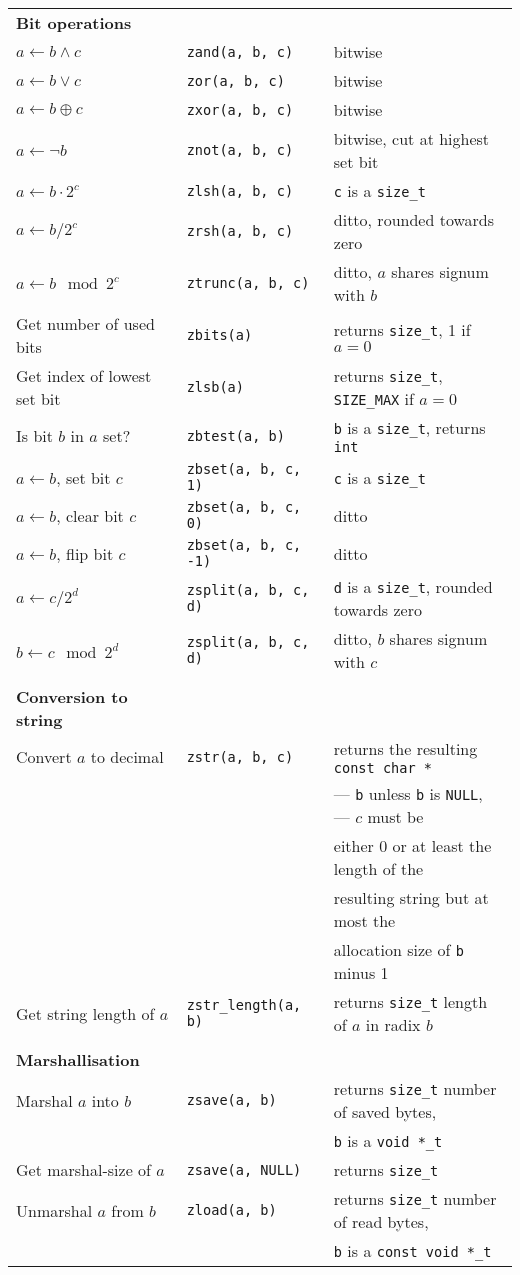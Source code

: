 \documentclass[10pt,draft]{article}
\newcommand{\size}{{\tt size\_t}}
\newcommand{\ullong}{{\tt unsigned long long int}}
\newcommand{\entry}[3]{ #2 & {\tt #1} & #3 \\ }
\newcommand{\entrycont}[1]{ & & \hspace*{2ex} #1 \\ }
\newcommand{\entryTwo}[4]{\entry{#1}{#2}{#3}\entrycont{#4}}
\newcommand{\entryThree}[5]{\entryTwo{#1}{#2}{#3}{#4}\entrycont{#5}}
\newcommand{\entryFour}[6]{\entryThree{#1}{#2}{#3}{#4}{#5}\entrycont{#6}}
\newcommand{\entryFive}[7]{\entryFour{#1}{#2}{#3}{#4}{#5}{#6}\entrycont{#7}}
\begin{document}
\begin{tabular}{lll}



\textbf{Bit operations} \\
\entry{zand(a, b, c)}      {$a \gets b \wedge c$}         {bitwise}
\entry{zor(a, b, c)}       {$a \gets b \vee c$}           {bitwise}
\entry{zxor(a, b, c)}      {$a \gets b \oplus c$}         {bitwise}
\entry{znot(a, b, c)}      {$a \gets \lnot b$}            {bitwise, cut at highest set bit}
\entry{zlsh(a, b, c)}      {$a \gets b \cdot 2^c$}        {{\tt c} is a \size{}}
\entry{zrsh(a, b, c)}      {$a \gets b / 2^c$}            {ditto, rounded towards zero}
\entry{ztrunc(a, b, c)}    {$a \gets b \mod 2^c$}         {ditto, $a$ shares signum with $b$}
\entry{zbits(a)}           {Get number of used bits}      {returns \size{}, 1 if $a = 0$}
\entry{zlsb(a)}            {Get index of lowest set bit}  {returns \size{}, {\tt SIZE\_MAX} if $a = 0$}
\entry{zbtest(a, b)}       {Is bit $b$ in $a$ set?}       {{\tt b} is a \size{}, returns {\tt int}}
\entry{zbset(a, b, c, 1)}  {$a \gets b$, set bit $c$}     {{\tt c} is a \size{}}
\entry{zbset(a, b, c, 0)}  {$a \gets b$, clear bit $c$}   {ditto}
\entry{zbset(a, b, c, -1)} {$a \gets b$, flip bit $c$}    {ditto}
\entry{zsplit(a, b, c, d)} {$a \gets c / 2^d$}            {{\tt d} is a \size{}, rounded towards zero}
\entry{zsplit(a, b, c, d)} {$b \gets c \mod 2^d$}         {ditto, $b$ shares signum with $c$}
\\

\textbf{Conversion to string} \\
\entryFive{zstr(a, b, c)}           {Convert $a$ to decimal}   {returns the resulting {\tt const char *}}
                                                               {--- {\tt b} unless {\tt b} is
                                                                    {\tt NULL}, --- $c$ must be}
                                                               {either 0 or at least the length of the}
                                                               {resulting string but at most the}
                                                               {allocation size of {\tt b} minus 1}
\entry    {zstr\_length(a, b)}      {Get string length of $a$} {returns \size{} length of $a$ in radix $b$}
\\

\textbf{Marshallisation} \\
\entryTwo{zsave(a, b)}    {Marshal $a$ into $b$}    {returns \size{} number of saved bytes,}
                                                    {{\tt b} is a {\tt void *\_t}}
\entry   {zsave(a, NULL)} {Get marshal-size of $a$} {returns \size{}}
\entryTwo{zload(a, b)}    {Unmarshal $a$ from $b$}  {returns \size{} number of read bytes,}
                                                    {{\tt b} is a {\tt const void *\_t}}


\end{tabular}
\end{document}
